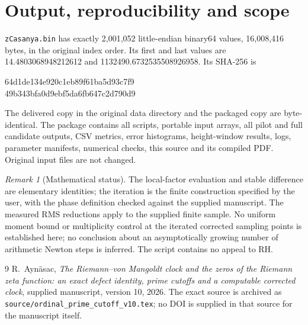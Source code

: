 \documentclass[11pt]{amsart}
\numberwithin{equation}{section}
\theoremstyle{definition}\newtheorem{definition}[proposition]{Definition}
\theoremstyle{remark}\newtheorem{remark}[proposition]{Remark}
\begin{document}
\section{Output, reproducibility and scope}\label{sec:delivery}
\texttt{zCasanya.bin} has exactly 2,001,052 little-endian binary64 values,
16,008,416 bytes, in the original index order. Its first and last values are
14.4803068948212612 and 1132490.6732535508926958. Its SHA-256 is
\begin{center}\ttfamily\footnotesize 64d1de134e920c1eb89f61ba5d93c7f9\\49b343bfa0d9ebf5da6fb647c2d790d9\end{center}
The delivered copy in the original data directory and the packaged copy
are byte-identical. The package contains all scripts, portable input arrays,
all pilot and full candidate outputs, CSV metrics, error histograms,
height-window results, logs, parameter manifests, numerical checks,
this source and its compiled PDF. Original input files are not changed.

\begin{remark}[Mathematical status]\label{rem:status}
The local-factor evaluation and stable difference are elementary identities;
the iteration is the finite construction specified by the user, with the
phase definition checked against the supplied manuscript. The measured
RMS reductions apply to the supplied finite sample. No uniform moment
bound or multiplicity control at the iterated corrected sampling points
is established here; no conclusion about an asymptotically growing number
of arithmetic Newton steps is inferred. The script contains no appeal to RH.
\end{remark}

\begin{thebibliography}{9}
R.~Ayn\"asac, \emph{The Riemann--von Mangoldt clock and the zeros of the
Riemann zeta function: an exact defect identity, prime cutoffs and a
computable corrected clock}, supplied manuscript, version 10, 2026.
The exact source is archived as \texttt{source/ordinal\_prime\_cutoff\_v10.tex};
no DOI is supplied in that source for the manuscript itself.
\end{thebibliography}
\end{document}
